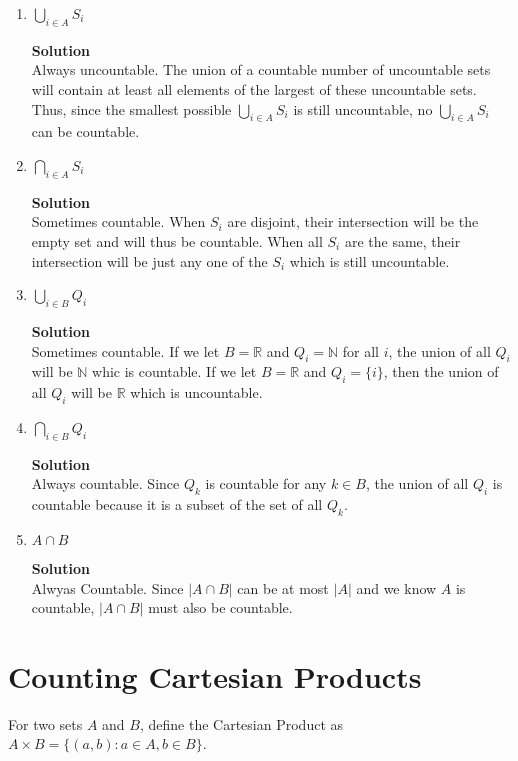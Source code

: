 \documentclass[11pt]{article}
\newcommand*{\Question}[1]{\section{#1}}
\newenvironment{Parts}{\begin{enumerate}[label=(\alph*)]}{\end{enumerate}}
\newcommand*{\Part}{\item}
\newenvironment{Answer}{\vspace{10pt}\begin{mdframed}\textbf{Solution}\\}{\end{mdframed}\vfill\pagebreak[3]}
\newenvironment{Answer}{\vspace{10pt}}{\vfill\pagebreak[3]}
\newcommand*{\N}{\mathbb{N}}
\newcommand*{\R}{\mathbb{R}}
\begin{document}
\begin{Parts}
    
\Part $\bigcup_{i \in A} S_i$
\begin{Answer}
Always uncountable. The union of a countable number of uncountable sets will contain at least all elements of the largest of these uncountable sets. Thus, since the smallest possible $\bigcup_{i \in A} S_i$ is still uncountable, no $\bigcup_{i \in A} S_i$ can be countable. 
\end{Answer}

\Part $\bigcap_{i \in A} S_i$
\begin{Answer}
Sometimes countable. When $S_i$ are disjoint, their intersection will be the empty set and will thus be countable. When all $S_i$ are the same, their intersection will be just any one of the $S_i$ which is still uncountable. 
\end{Answer}

\Part $\bigcup_{i \in B} Q_i$
\begin{Answer}
Sometimes countable. If we let $B=\R$ and $Q_i=\N$ for all $i$, the union of all $Q_i$ will be $\N$ whic is countable. If we let $B=\mathbb{R}$ and $Q_i=\{i\}$, then the union of all $Q_i$ will be $\R$ which is uncountable.
\end{Answer}

\Part $\bigcap_{i \in B} Q_i$
\begin{Answer}
Always countable. Since $Q_k$ is countable for any $k\in B$, the union of all $Q_i$ is countable because it is a subset of the set of all $Q_k$. 
\end{Answer}

\Part $A \cap B$
\begin{Answer}
Alwyas Countable. Since $|A \cap B|$ can be at most $|A|$ and we know $A$ is countable, $|A \cap B|$ must also be countable.
\end{Answer}

\end{Parts}


\Question{Counting Cartesian Products}

For two sets $A$ and $B$, define the Cartesian Product as $A \times B = \{(a,b) : a \in A, b \in B \}$.
\end{document}
